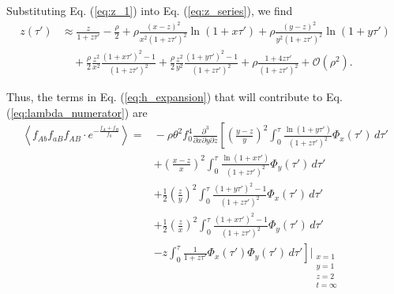 \documentclass[11pt]{article}
\begin{document}
Substituting Eq. (\ref{eq:z_1}) into Eq. (\ref{eq:z_series}), we find
\begin{align}
    z(\tau') &\approx \frac{z}{1+z\tau'} 
    - \frac{\rho}{2}
    + \rho\frac{(x-z)^2}{x^2(1+z\tau')^2}\ln(1+x\tau')
    + \rho\frac{(y-z)^2}{y^2(1+z\tau')^2}\ln(1+y\tau') \\\nonumber
    &\quad + \frac{\rho}{2}\frac{z^2}{x^2}\frac{(1+x\tau')^2-1}{(1+z\tau')^2}
    + \frac{\rho}{2}\frac{z^2}{y^2}\frac{(1+y\tau')^2-1}{(1+z\tau')^2}
    + \rho\frac{1+4z\tau'}{(1+z\tau')^2} + \mathcal{O}(\rho^2).
\end{align}

Thus, the terms in Eq. (\ref{eq:h_expansion}) that will contribute to Eq. (\ref{eq:lambda_numerator}) are 
\begin{align}
    \left\langle f_{Ab}f_{aB}f_{AB}\cdot e^{-\frac{f_{A}+f_{B}}{f_0}}\right\rangle =&{} -\rho \theta^2 f_0^4 \frac{\partial^3}{\partial x \partial y \partial z} \left[ \left(\frac{y-z}{y}\right)^2 \int_0^{\tau} \frac{\ln(1+y\tau')}{(1+z\tau')^2} \Phi_x(\tau') \,d\tau' \right. \\\nonumber
    &+ \left. \left(\frac{x-z}{x}\right)^2 \int_0^{\tau} \frac{\ln(1+x\tau')}{(1+z\tau')^2} \Phi_y(\tau') \,d\tau' \right. \\\nonumber
    &+ \left. \frac{1}{2} \left(\frac{z}{y}\right)^2 \int_0^{\tau}  \frac{(1+y\tau')^2-1}{(1+z\tau')^2}\Phi_x(\tau') \,d\tau' \right. \\\nonumber
    &+ \left. \frac{1}{2} \left(\frac{z}{x}\right)^2 \int_0^{\tau} \frac{(1+x\tau')^2-1}{(1+z\tau')^2}\Phi_y(\tau') \,d\tau' \right. \\\nonumber
    &- \left.  z\int_0^{\tau} \frac{1}{1+z\tau'} \Phi_x(\tau')\Phi_y(\tau') \,d\tau'\right]\Bigg\vert_{\substack{x=1 \\ y=1 \\ z=2 \\ t=\infty}} \\\nonumber

\end{align}
\end{document}
